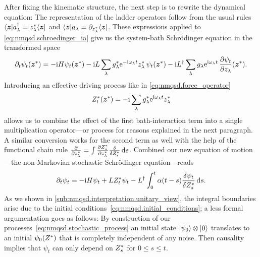 After fixing the kinematic structure, the next step is to rewrite the dynamical equation:
The representation of the ladder operators follow from the usual rules $\langle \boldsymbol{z} | a^\dagger_\lambda = {z}^*_\lambda \langle \boldsymbol{z} |$ and $\langle \boldsymbol{z} | a_\lambda = \partial_{{z}^*_\lambda} \langle \boldsymbol{z} |$.
These expressions applied to \autoref{eq:nmqsd.schroedinger_ia} give us the system-bath Schrödinger equation in the transformed space
\begin{equation}
  \partial_t \psi_t(\cc\zz) = -\ii\Hsys\psi_t(\cc\zz)  -  \ii L \sum_\lambda \cc g_\lambda \exp[-\ii\omega_\lambda t] \cc z_\lambda \, \psi_t(\cc\zz)  -  \ii \adj{L} \sum_\lambda g_\lambda \exp[\ii\omega_\lambda t] \, \frac{\partial \psi_t}{\partial z_\lambda}(\cc\zz).
  \label{eq:nmqsd.hamiltonian_microsopic}
\end{equation}
Introducing an effective driving process like in \autoref{eq:nmqsd.force_operator}
\begin{equation}
  \ZZ_t(\cc\zz) = - \ii \sum_\lambda \cc g_\lambda \exp[\ii \omega_\lambda t] \cc z_\lambda
  \label{eq:nmqsd.stochastic_process}
\end{equation}
allows us to combine the effect of the first bath-interaction term into a single multiplication operator---or process for reasons explained in the next paragraph.
A similar conversion works for the second term as well with the help of the functional chain rule $\frac{\partial}{\partial {z}^*_\lambda} = \int \frac{\partial {Z}^*_s}{\partial{z}^*_\lambda} \frac{\delta}{\delta {Z}^*_s} \, \mathrm{d} s$.
Combined our new equation of motion ---the non-Markovian stochastic Schrödinger equation---reads
\begin{equation}
  \partial_t \psi_t = -\mathrm{i}H\psi_t  +  L{Z}^*_t\psi_t  -  L^\dagger \int_0^t \alpha(t-s) \frac{\delta \psi_t}{\delta {Z}^*_s} \, \mathrm{d} s.
  \label{eq:nmqsd.nmsse}
\end{equation}
As we shown in \autoref{sub:nmqsd.interpretation.unitary_view}, the integral boundaries arise due to the initial conditions~\ref{eq:nmqsd.initial_conditions}; a less formal argumentation goes as follows:
By construction of our processes~\ref{eq:nmqsd.stochastic_process} an initial state $| \psi_0 \rangle\otimes| 0 \rangle$ translates to an initial $\psi_0({Z}^*)$ that is completely independent of any noise.
Then causality implies that $\psi_t$ can only depend on ${Z}^*_s$ for $0 \le s \le t$.\\



